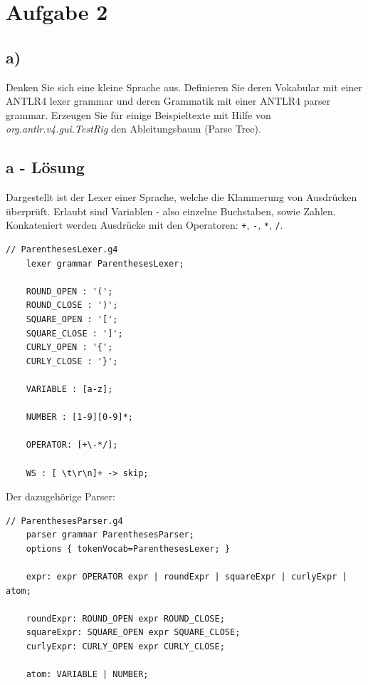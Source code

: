 \section*{Aufgabe 2}
\subsection*{a)}
Denken Sie sich eine kleine Sprache aus.
Definieren Sie deren Vokabular mit einer ANTLR4 lexer grammar und deren Grammatik mit einer ANTLR4 parser grammar.
Erzeugen Sie für einige Beispieltexte mit Hilfe von \textit{org.antlr.v4.gui.TestRig} den Ableitungsbaum (Parse Tree).

\subsection*{a - Lösung}
Dargestellt ist der Lexer einer Sprache, welche die Klammerung von Ausdrücken überprüft.
Erlaubt sind Variablen - also einzelne Buchstaben, sowie Zahlen.
Konkateniert werden Ausdrücke mit den Operatoren: \texttt{+}, \texttt{-}, \texttt{*}, \texttt{/}.
\newline
\begin{lstlisting}[label={lst:Aufgabe2a_lexer}, style=ANTLR]
    // ParenthesesLexer.g4
    lexer grammar ParenthesesLexer;

    ROUND_OPEN : '(';
    ROUND_CLOSE : ')';
    SQUARE_OPEN : '[';
    SQUARE_CLOSE : ']';
    CURLY_OPEN : '{';
    CURLY_CLOSE : '}';

    VARIABLE : [a-z];

    NUMBER : [1-9][0-9]*;

    OPERATOR: [+\-*/];

    WS : [ \t\r\n]+ -> skip;
\end{lstlisting}

\newpage

Der dazugehörige Parser:
\begin{lstlisting}[label={lst:Aufgabe2a_parser}, style=ANTLR]
    // ParenthesesParser.g4
    parser grammar ParenthesesParser;
    options { tokenVocab=ParenthesesLexer; }

    expr: expr OPERATOR expr | roundExpr | squareExpr | curlyExpr | atom;

    roundExpr: ROUND_OPEN expr ROUND_CLOSE;
    squareExpr: SQUARE_OPEN expr SQUARE_CLOSE;
    curlyExpr: CURLY_OPEN expr CURLY_CLOSE;

    atom: VARIABLE | NUMBER;
\end{lstlisting}
\newline

